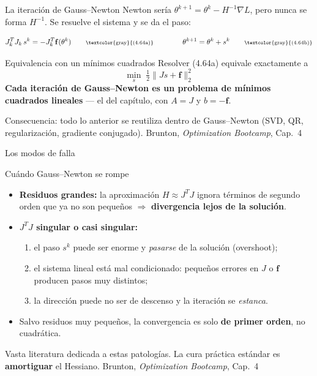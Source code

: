 \documentclass[10pt,aspectratio=169]{beamer}
\newcommand{\fuente}{\vfill{\scriptsize\color{gray}Brunton, \emph{Optimization Bootcamp}, Cap.~4}}
\begin{document}
\begin{frame}{La iteración de Gauss--Newton}
  \small
  Newton sería $\theta^{k+1} = \theta^k - H^{-1}\nabla L$, pero nunca se forma
  $H^{-1}$. Se resuelve el sistema y se da el paso:

  \[
    J_k^TJ_k\, s^k = -J_k^T\mathbf{f}(\theta^k) \qquad\text{\scriptsize\textcolor{gray}{(4.64a)}}
    \qquad\qquad
    \theta^{k+1} = \theta^k + s^k \qquad\text{\scriptsize\textcolor{gray}{(4.64b)}}
  \]

  \begin{block}{Equivalencia con un mínimos cuadrados}
    \small
    Resolver (4.64a) equivale exactamente a
    \[
      \min_s \; \tfrac12\|Js + \mathbf{f}\|_2^2 \tag{4.66}
    \]
    \textbf{Cada iteración de Gauss--Newton es un problema de mínimos cuadrados
    lineales} --- el del capítulo, con $A=J$ y $b=-\mathbf{f}$.
  \end{block}

  \vspace{1mm}
  \footnotesize
  Consecuencia: todo lo anterior se reutiliza dentro de Gauss--Newton (SVD,
  QR, regularización, gradiente conjugado).
  \fuente
\end{frame}

\begin{frame}{Los modos de falla}
  \small
  \begin{alertblock}{Cuándo Gauss--Newton se rompe}
    \begin{itemize}
      \item \textbf{Residuos grandes:} la aproximación $H \approx J^TJ$ ignora
        términos de segundo orden que ya no son pequeños
        $\Rightarrow$ \textbf{divergencia lejos de la solución}.
      \item \textbf{$J^TJ$ singular o casi singular:}
        \begin{enumerate}
          \item el paso $s^k$ puede ser enorme y \emph{pasarse} de la solución
            (overshoot);
          \item el sistema lineal está mal condicionado: pequeños errores en
            $J$ o $\mathbf{f}$ producen pasos muy distintos;
          \item la dirección puede no ser de descenso y la iteración se
            \emph{estanca}.
        \end{enumerate}
      \item Salvo residuos muy pequeños, la convergencia es solo
        \textbf{de primer orden}, no cuadrática.
    \end{itemize}
  \end{alertblock}

  \vspace{1mm}
  Vasta literatura dedicada a estas patologías. La cura práctica estándar es
  \textbf{amortiguar} el Hessiano.
  \fuente
\end{frame}
\end{document}
